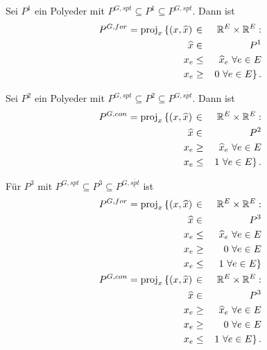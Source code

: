 \documentclass[10p,a4paper,BCOR = 12mm, DIV=15]{scrbook}
\begin{document}
\begin{Le}
Sei $P^1$ ein Polyeder mit $P^{G, spt} \subseteq P^1 \subseteq P^{G, \underline{spt}}$. Dann ist
\begin{eqnarray*}
P^{G, for} = \operatorname{proj}_x \left\{\left(x, \widehat{x}\right) \right. & \in & \mathbb{R}^E \times \mathbb{R}^E: \nonumber \\
\widehat{x} & \in & P^1 \\
x_e & \leq & \widehat{x}_e\ \forall e \in E \\
x_e & \geq & \left.0\ \forall e \in E\right\}.
\end{eqnarray*}

Sei $P^2$ ein Polyeder mit $P^{G, spt} \subseteq P^2 \subseteq P^{G, \overline{spt}}$. Dann ist
\begin{eqnarray*}
P^{G, con} = \operatorname{proj}_x \left\{\left(x, \widehat{x}\right) \right. & \in & \mathbb{R}^E \times \mathbb{R}^E: \nonumber \\
\widehat{x} & \in & P^2 \\
x_e & \geq & \widehat{x}_e\ \forall e \in E \\
x_e & \leq & \left.1\ \forall e \in E\right\}.
\end{eqnarray*}

Für $P^3$ mit $P^{G, spt} \subseteq P^3 \subseteq P^{G, \overline{\underline{spt}}}$ ist
\begin{eqnarray*}
P^{G, for} = \operatorname{proj}_x \left\{\left(x, \widehat{x}\right) \right. & \in & \mathbb{R}^E \times \mathbb{R}^E: \nonumber \\
\widehat{x} & \in & P^3 \\
x_e & \leq & \widehat{x}_e\ \forall e \in E \\
x_e & \geq & 0\ \forall e \in E \\
x_e & \leq & \left.1\ \forall e \in E\right\} \\
P^{G, con} = \operatorname{proj}_x \left\{\left(x, \widehat{x}\right) \right. & \in & \mathbb{R}^E \times \mathbb{R}^E: \nonumber \\
\widehat{x} & \in & P^3 \\
x_e & \geq & \widehat{x}_e\ \forall e \in E \\
x_e & \geq & 0\ \forall e \in E \\
x_e & \leq & \left.1\ \forall e \in E\right\}.
\end{eqnarray*}
\end{Le}
\end{document}
